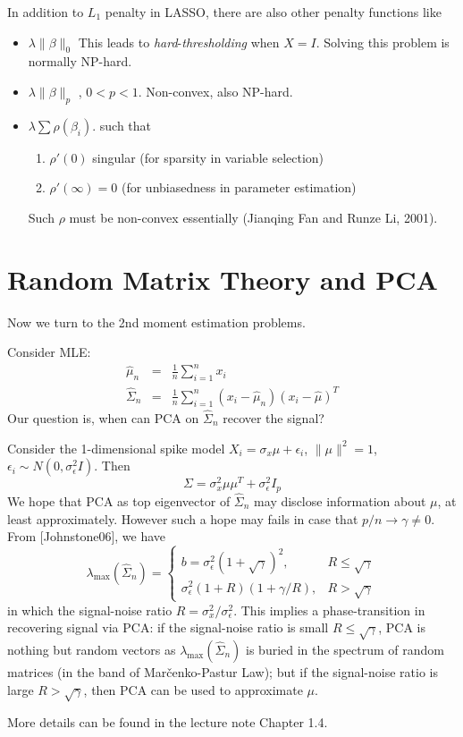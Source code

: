 \documentclass[twoside]{article}
\theoremstyle{plain}
\theoremstyle{definition}
\theoremstyle{remark}
\begin{document}
In addition to $L_1$ penalty in LASSO, there are also other 
penalty functions like
\begin{itemize}
\item $\lambda \lVert \beta \rVert_0$  This leads to 
	\emph{hard}-\emph{thresholding} when $X = I$. Solving this problem is
	normally NP-hard.
\item $\lambda \lVert \beta \rVert_p$ , $0<p<1$. Non-convex, also NP-hard.
\item $\lambda \sum \rho(\beta_i)$. such that
	\begin{enumerate}
		\item $\rho'(0)$ singular (for sparsity in variable selection)
		\item $\rho'(\infty)=0$ (for unbiasedness in parameter estimation)
	\end{enumerate}
	Such $\rho$ must be non-convex essentially (Jianqing Fan and Runze Li, 2001).
\end{itemize}

\section{Random Matrix Theory and PCA}
Now we turn to the 2nd moment estimation problems.

Consider MLE:
\begin{eqnarray*}
	\hat{\mu}_n &=& \frac{1}{n} \sum_{i=1}^n x_i \\
	\hat{\Sigma}_n &=& \frac{1}{n} 
		\sum_{i=1}^n(x_i - \hat{\mu}_n)(x_i - \hat{\mu})^T
\end{eqnarray*}
Our question is, when can PCA on $\hat{\Sigma}_n$ recover the signal?

Consider the 1-dimensional spike model $X_i = \sigma_x \mu + \epsilon_i$, $\lVert \mu \rVert^2 = 1$,
$\epsilon_i \sim N(0,\sigma_\epsilon^2 I)$. 
Then
\[
	\Sigma = \sigma_x^2 \mu \mu^T + \sigma_\epsilon^2 I_p
\]
We hope that PCA as top eigenvector of $\hat{\Sigma}_n$ may disclose information about $\mu$, at least approximately. However such a hope may fails in case that $p/n \to \gamma \ne 0$. From [Johnstone06], we have
\[
	\lambda_{\max}(\hat{\Sigma}_n) = \left\{\begin{array}{cc}
			b = \sigma_\epsilon^2(1+\sqrt{\gamma})^2, & R \le \sqrt{\gamma} \\
			\sigma_\epsilon^2(1+R)(1+\gamma/R), & R > \sqrt{\gamma}
		\end{array}\right.
\]
in which the signal-noise ratio $R = \sigma_x^2 / \sigma_\epsilon^2$. This implies a phase-transition in recovering signal via PCA: if the signal-noise ratio is small $R\leq\sqrt{\gamma}$, PCA is nothing but random vectors as $\lambda_{\max}(\hat{\Sigma}_n) $ is buried in the spectrum of random matrices (in the band of Mar\v{c}enko-Pastur Law); but if the signal-noise ratio is large $R>\sqrt{\gamma}$, then PCA can be used to approximate $\mu$. 

More details can be found in the lecture note Chapter 1.4. 
\end{document}
